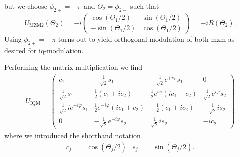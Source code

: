 but we choose $\phi_{2+}=-\pi$ and $\Theta_2=\phi_{2-}$ such that
\begin{equation}
	U_\text{MZM2}(\Theta_2)
	=
	-i
	\begin{pmatrix}
		\cos(\Theta_1/2) & \sin(\Theta_1/2) \\
		-\sin(\Theta_1/2) & \cos(\Theta_1/2)
	\end{pmatrix}
	=
	-i
	R(\Theta_2)
	.
\end{equation}
Using $\phi_{2+}=-\pi$ turns out to yield orthogonal modulation of both \gls{mzm} as desired for \gls{iq}-modulation.

Performing the matrix multiplication we find
\begin{equation}
	\begin{split}
		U_\text{IQM}
		=
		\begin{pmatrix}
			c_1 & -\frac{1}{\sqrt{2}}s_1 & -\frac{1}{\sqrt{2}}e^{+i\varphi}s_1 & 0 \\
			\frac{1}{\sqrt{2}}s_1 & \frac{1}{2}(c_1+ic_2) & \frac{1}{2}e^{i\varphi}(ic_1+c_2) & \frac{1}{\sqrt{2}}e^{i\varphi}s_2 \\
			\frac{1}{\sqrt{2}}ie^{-i\varphi}s_1 & \frac{1}{2}e^{-i\varphi}(ic_1+c_2) & -\frac{1}{2}(c_1+ic_2) & -\frac{1}{\sqrt{2}}is_2 \\
			0 & -\frac{1}{\sqrt{2}}e^{-i\varphi}s_2 & \frac{1}{\sqrt{2}}is_2 & -ic_2
		\end{pmatrix}
	\end{split}
\end{equation}
where we introduced the shorthand notation
\begin{align}
	c_j
	&=
	\cos(\Theta_j/2)
	&
	s_j
	&=
	\sin(\Theta_j/2)
	.
\end{align}

